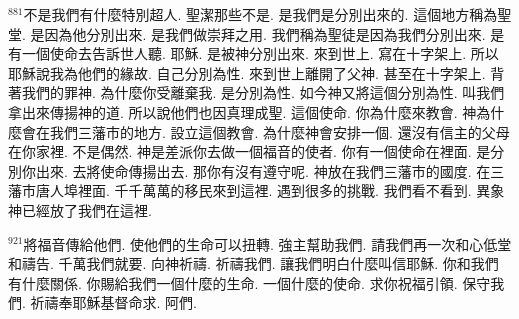\documentclass{book}
\begin{document}
$^{881}$不是我們有什麼特別超人.
聖潔那些不是.
是我們是分別出來的.
這個地方稱為聖堂.
是因為他分別出來.
是我們做崇拜之用.
我們稱為聖徒是因為我們分別出來.
是有一個使命去告訴世人聽.
耶穌.
是被神分別出來.
來到世上.
寫在十字架上.
所以耶穌說我為他們的緣故.
自己分別為性.
來到世上離開了父神.
甚至在十字架上.
背著我們的罪神.
為什麼你受離棄我.
是分別為性.
如今神又將這個分別為性.
叫我們拿出來傳揚神的道.
所以說他們也因真理成聖.
這個使命.
你為什麼來教會.
神為什麼會在我們三藩市的地方.
設立這個教會.
為什麼神會安排一個.
還沒有信主的父母在你家裡.
不是偶然.
神是差派你去做一個福音的使者.
你有一個使命在裡面.
是分別你出來.
去將使命傳揚出去.
那你有沒有遵守呢.
神放在我們三藩市的國度.
在三藩市唐人埠裡面.
千千萬萬的移民來到這裡.
遇到很多的挑戰.
我們看不看到.
異象神已經放了我們在這裡.

$^{921}$將福音傳給他們.
使他們的生命可以扭轉.
強主幫助我們.
請我們再一次和心低堂和禱告.
千萬我們就要.
向神祈禱.
祈禱我們.
讓我們明白什麼叫信耶穌.
你和我們有什麼關係.
你賜給我們一個什麼的生命.
一個什麼的使命.
求你祝福引領.
保守我們.
祈禱奉耶穌基督命求.
阿們.
\newpage
\end{document}
